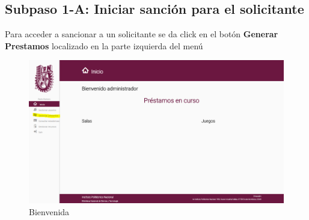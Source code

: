 \subsection{Subpaso 1-A: Iniciar sanción para el solicitante}
	Para acceder a sancionar a un solicitante se da click en el botón
	 \textbf{Generar Prestamos} localizado en la parte izquierda del menú
	
	\begin{figure}[hbtp]

	\includegraphics[scale=0.3]{images/Interfaz/IUGS07_bienvenida.PNG}
	\caption{Bienvenida}
	\end{figure}
